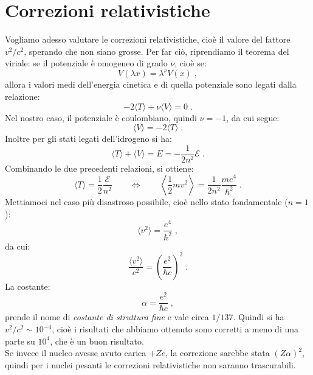 \documentclass[12pt,a4paper]{report}
\theoremstyle{definition}
\numberwithin{equation}{section}
\newcommand{\bra}{\langle}
\newcommand{\ket}{\rangle}
\begin{document}
\section{Correzioni relativistiche}
Vogliamo adesso valutare le correzioni relativistiche, cioè il valore del fattore $v^2/c^2$, sperando che non siano grosse. Per far ciò, riprendiamo il teorema del viriale: se il potenziale è omogeneo di grado $\nu$, cioè se:
\begin{equation}
V(\lambda x)=\lambda^\nu V(x)\;,
\end{equation}
allora i valori medi dell'energia cinetica e di quella potenziale sono legati dalla relazione:
\begin{equation}
-2\bra T\ket+\nu\bra V\ket=0\;.
\end{equation}
Nel nostro caso, il potenziale è coulombiano, quindi $\nu=-1$, da cui segue:
\begin{equation}
\bra V\ket =-2\bra T \ket\;.
\end{equation}
Inoltre per gli stati legati dell'idrogeno si ha:
\begin{equation}
\bra T\ket+\bra V\ket=E=-\frac{1}{2n^2}\mathcal{E}\;.
\end{equation}
Combinando le due precedenti relazioni, si ottiene:
\begin{equation}
\bra T\ket=\frac{1}{2}\frac{\mathcal{E}}{n^2} \qquad \Longleftrightarrow \qquad \left\langle \frac{1}{2}mv^2\right\rangle=\frac{1}{2n^2}\frac{me^4}{\hbar^2}\;.
\end{equation}
Mettiamoci nel caso più disastroso possibile, cioè nello stato fondamentale ($n=1$):
\begin{equation}
\bra v^2\ket=\frac{e^4}{\hbar^2}\;,
\end{equation}
da cui:
\begin{equation}
\frac{\bra v^2\ket}{c^2}=\left(\frac{e^2}{\hbar c}\right)^2\;.
\end{equation}
La costante:
\begin{equation}
\alpha=\frac{e^2}{\hbar c}\;,
\end{equation}
prende il nome di \textit{costante di struttura fine} e vale circa $1/137$. Quindi si ha $v^2/c^2\sim 10^{-4}$, cioè i risultati che abbiamo ottenuto sono corretti a meno di una parte su $10^4$, che è un buon risultato. \\
Se invece il nucleo avesse avuto carica $+Ze$, la correzione sarebbe stata $(Z\alpha)^2$, quindi per i nuclei pesanti le correzioni relativistiche non saranno trascurabili. \\
\end{document}
